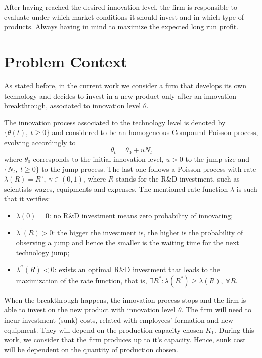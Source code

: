 After having reached the desired innovation level, the firm is responsible to evaluate under which market conditions it should invest and in which type of products. Always having in mind to maximize the expected long run profit.




\section{Problem Context}
\label{section:context}

As stated before, in the current work we consider a firm that develops its own technology and decides to invest in a new product only after an innovation breakthrough, associated to innovation level $\theta$.

The innovation process associated to the technology level is denoted by $\{ \theta(t), \ t \geq 0 \}$ and considered to be an homogeneous Compound Poisson process, evolving accordingly to
$$\theta_t= \theta_0+ u N_t$$  
where $\theta_0$ corresponds to the initial innovation level, $u > 0$ to the jump size and $\{N_t, \ t \geq 0\}$  to the jump process. The last one follows a Poisson process with rate $\lambda(R)=R^\gamma, \ \gamma \in (0,1)$, where $R$ stands for the R\&D investment, such as scientists wages, equipments and expenses. The mentioned rate function $\lambda$ is such that it verifies:
\begin{itemize}
	\item $\lambda(0) = 0$: no R\&D investment means zero probability of innovating;
	\item $\lambda^\prime (R)>0$: the bigger the investment is, the higher is the probability of observing a jump and hence the smaller is the waiting time for the next technology jump;
	\item $ \lambda ^{ \prime \prime} (R)<0$: exists an optimal R\&D investment that leads to the maximization of the rate function, that is, $\exists R^*: \lambda(R^*)\geq \lambda(R), \  \forall R$.
\end{itemize}


When the breakthrough happens, the innovation process stops and the firm is able to invest on the new product with innovation level $\theta$. The firm will need to incur investment (sunk) costs, related with employees' formation and new equipment. They will depend on the production capacity chosen $K_1$. During this work, we consider that the firm produces up to it's capacity. Hence, sunk cost will be dependent on the quantity of production chosen.

